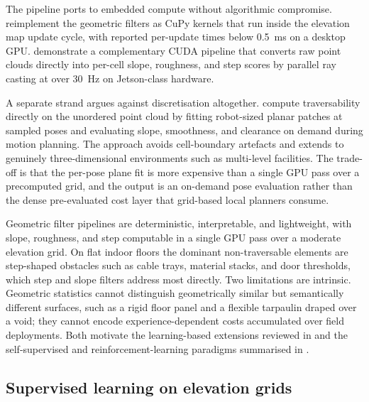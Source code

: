 \documentclass[11pt,a4paper]{article}
\begin{document}
The pipeline ports to embedded compute without algorithmic compromise. \citet{mikiElevationMappingLocomotion2022} reimplement the geometric filters as CuPy kernels that run inside the elevation map update cycle, with reported per-update times below \SI{0.5}{\milli\second} on a desktop GPU. \citet{panGPUAcceleratedRealtime2019} demonstrate a complementary CUDA pipeline that converts raw point clouds directly into per-cell slope, roughness, and step scores by parallel ray casting at over \SI{30}{\hertz} on Jetson-class hardware.

A separate strand argues against discretisation altogether. \citet{krusi2017} compute traversability directly on the unordered point cloud by fitting robot-sized planar patches at sampled poses and evaluating slope, smoothness, and clearance on demand during motion planning. The approach avoids cell-boundary artefacts and extends to genuinely three-dimensional environments such as multi-level facilities. The trade-off is that the per-pose plane fit is more expensive than a single GPU pass over a precomputed grid, and the output is an on-demand pose evaluation rather than the dense pre-evaluated cost layer that grid-based local planners consume.

Geometric filter pipelines are deterministic, interpretable, and lightweight, with slope, roughness, and step computable in a single GPU pass over a moderate elevation grid. On flat indoor floors the dominant non-traversable elements are step-shaped obstacles such as cable trays, material stacks, and door thresholds, which step and slope filters address most directly. Two limitations are intrinsic. Geometric statistics cannot distinguish geometrically similar but semantically different surfaces, such as a rigid floor panel and a flexible tarpaulin draped over a void; they cannot encode experience-dependent costs accumulated over field deployments. Both motivate the learning-based extensions reviewed in  and the self-supervised and reinforcement-learning paradigms summarised in .

\subsection{Supervised learning on elevation grids}
\label{sec:sq2:supervised}
\end{document}
